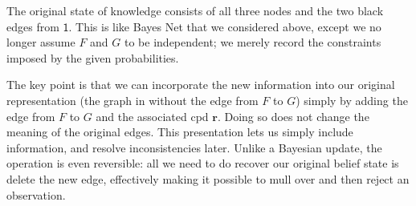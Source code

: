 \documentclass{article}
\theoremstyle{plain}
\theoremstyle{definition}
\newenvironment{example}
	{\pushQED{\qed}\renewcommand{\qedsymbol}{$\triangle$}\examplex}
	{\popQED\endexamplex%
}
\theoremstyle{remark}
\newcommand\mat[1]{\mathbf{#1}}
\newcommand{\var}[1]{\mathsf{#1}}
\numberwithin{equation}{section}
\begin{document}
\begin{example}
                
		The original state of knowledge consists of all three
                nodes and the two black edges from $\var 1$. This is
                like Bayes Net that we considered above, except we no
                longer assume $F$ and $G$ to be independent; we merely
                record the constraints imposed by the given
                probabilities. 
	
		The key point is that we can incorporate the new information into
		our original representation (the graph in 
		without the edge from $F$ to $G$) simply  by adding the edge from $F$
		to $G$ and the associated cpd $\mat r$.
                Doing so does not change the meaning
		of the original edges.  This presentation lets us simply include
		information, and resolve inconsistencies later. Unlike a Bayesian
		update, the operation is even reversible: all we need to do recover
		our original belief state is delete the new edge, effectively making
		it possible to mull over and then reject an observation.
	\end{example}
\end{document}
